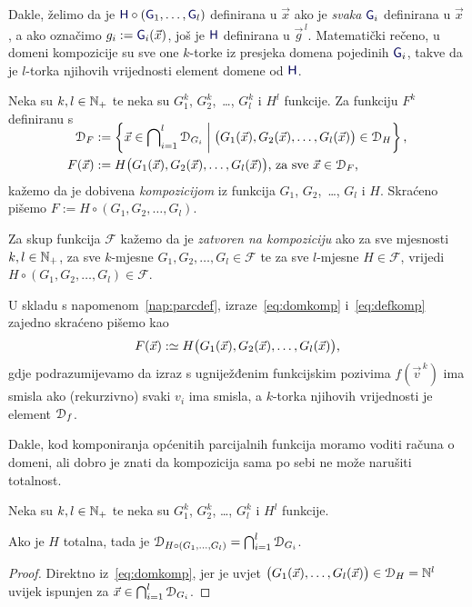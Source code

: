Dakle, želimo da je $\f H\circ(\f G_1,\dotsc,\f G_l)$ definirana u $\vec x$ ako je \emph{svaka} $\f G_i$ definirana u $\vec x$, a ako označimo $g_i:=\f G_i(\vec x)$, još je $\f H$ definirana u $\vec g^{\,l}$. Matematički rečeno, u domeni kompozicije su sve one $k$-torke iz presjeka domena pojedinih $\f G_i$, takve da je $l$-torka njihovih vrijednosti element domene od $\f H$.
\begin{definicija}[{name=[kompozicija]}]
Neka su $k,l\in{\mathbb N}_+$ te neka su $G_1^k$, $G_2^k$,~\ldots, $G_l^k$ i $H^l$ funkcije. Za funkciju $F^k$ definiranu s
\begin{align}
\SwapAboveDisplaySkip
\label{eq:domkomp}
    \dom{F}&:=\left\{\vec x\in\bigcap\nolimits_{i=1}^l\dom{G_i}\;\middle|\;\bigl(G_1(\vec x),G_2(\vec x),\dotsc,G_l(\vec x)\bigr)\in\dom{H}\right\}\text,\\
\label{eq:defkomp}
    F(\vec x)&:=H\bigl(G_1(\vec x),G_2(\vec x),\dotsc,G_l(\vec x)\bigr)\text{, za sve $\vec x\in\dom F$,}
\end{align}
kažemo da je dobivena \emph{kompozicijom} iz funkcija $G_1$, $G_2$,~\ldots, $G_l$ i $H$. Skraćeno pišemo $F:=H\circ(G_1,G_2,\dotsc,G_l)$. %

Za skup funkcija $\mathcal F$ kažemo da je \emph{zatvoren na kompoziciju} ako za sve mjesnosti $k,l\in{\mathbb N}_+$, za sve $k$-mjesne $G_1,G_2,\dotsc,G_l\in\mathcal F$ te za sve $l$-mjesne $H\in\mathcal F$, vrijedi $H\circ(G_1,G_2,\dotsc,G_l)\in\mathcal F$.
\end{definicija}
U skladu s napomenom~\ref{nap:parcdef}, izraze~\eqref{eq:domkomp} i~\eqref{eq:defkomp} zajedno skraćeno pišemo kao
\begin{equation}
    F(\vec x):\simeq H\bigl(G_1(\vec x),G_2(\vec x),\dotsc,G_l(\vec x)\bigr)\text,
\end{equation}
gdje podrazumijevamo da izraz s ugniježđenim funkcijskim pozivima $f(\vec v^{\,k})$ ima smisla ako (rekurzivno) svaki $v_i$ ima smisla, a $k$-torka njihovih vrijednosti je element $\mathcal D_{f}$.

Dakle, kod komponiranja općenitih parcijalnih funkcija moramo voditi računa o domeni, ali dobro je znati da kompozicija sama po sebi ne može narušiti totalnost.

\begin{lema}[{name=[domena kompozicije slijeva s totalnom funkcijom]}]\label{lm:comptot}
    Neka su $k,l\in{\mathbb N}_+$ te neka su $G_1^k$, $G_2^k$, \ldots, $G_l^k$ i $H^l$ funkcije.
    
    Ako je $H$ totalna, tada je $\mathcal D_{H\circ(G_1,\dotsc,G_l)}=\bigcap_{i=1}^l\mathcal D_{G_i}$.
\end{lema}
\begin{proof}
    Direktno iz~\eqref{eq:domkomp}, jer je uvjet $\bigl(G_1(\vec x),\dotsc,G_l(\vec x)\bigr)\in\mathcal D_{H}={\mathbb N}^l$ uvijek ispunjen za $\vec x\in\bigcap_{i=1}^l\mathcal D_{G_i}$.
\end{proof}

